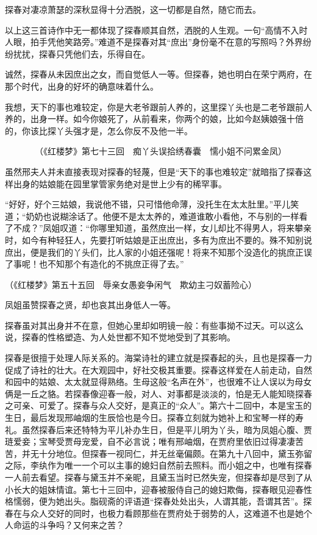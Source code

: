 \documentclass[openany,scheme = chinese, linespread = 1.5]{ctexbook}
\begin{document}
探春对凄凉萧瑟的深秋显得十分洒脱，这一切都是自然，随它而去。

以上这三首诗作中无一都体现了探春顺其自然，洒脱的人生观。一句“高情不入时人眼，拍手凭他笑路旁。”难道不是探春对其“庶出”身份毫不在意的写照吗？外界纷纷扰扰，探春只凭他们去，乐得自在。

诚然，探春从未因庶出之女，而自觉低人一等。但探春，她也明白在荣宁两府，在那个时代，出身的好坏的确意味着什么。

我想，天下的事也难较定，你是大老爷跟前人养的，这里探丫头也是二老爷跟前人养的，出身一样。如今你娘死了，从前看来，你两个的娘，比如今赵姨娘强十倍的，你该比探丫头强才是，怎么你反不及他一半。

\begin{center}
　　　　（《红楼梦》第七十三回　痴丫头误拾绣春囊　懦小姐不问累金凤）
\end{center}

虽然邢夫人并未直接表现对探春的轻蔑，但是“天下的事也难较定”就暗指了探春这样出身的姑娘能在园里掌管家务绝对是世上少有的稀罕事。

“好好，好个三姑娘，我说他不错，只可惜他命薄，没托生在太太肚里。”平儿笑道；“奶奶也说糊涂话了。他便不是太太养的，难道谁敢小看他，不与别的一样看了不成？”凤姐叹道：“你哪里知道，虽然庶出一样，女儿却比不得男人，将来攀亲时，如今有种轻狂人，先要打听姑娘是正出庶出，多有为庶出不要的。殊不知别说庶出，便是我们的丫头们，比人家的小姐还强呢！将来不知那个没造化的挑庶正误了事呢！也不知那个有造化的不挑庶正得了去。”

\begin{center}
（《红楼梦》第五十五回　辱亲女愚妾争闲气　欺幼主刁奴蓄险心）
\end{center}

凤姐虽赞探春之贤，却也哀其出身低人一等。

探春虽对其出身并不在意，但她心里却如明镜一般：有些事拗不过天。可以这么说，探春的性格塑造、为人处世都不知不觉地受到了其影响。

探春是很擅于处理人际关系的。海棠诗社的建立就是探春起的头，且也是探春一力促成了诗社的壮大。在大观园中，好社交极其重要。探春这样爱在人前走动，自然和园中的姑娘、太太就显得熟络。生母这般“名声在外”，也很难不让人误以为母女俩是一丘之貉。若探春像迎春一般，对人、对事都是淡淡的，怕是无人能知晓探春之可亲、可爱了。探春与众人交好，是真正的“众人”。第六十二回中，本是宝玉的生日，最后发现邢岫烟的生辰恰也是今日。探春立刻就为她补上和宝琴一样的寿礼。虽然探春后来还特特为平儿补办生日，但是平儿明为丫头，暗为凤姐心腹、贾琏爱妾；宝琴受贾母宠爱，自不必言说；唯有邢岫烟，在贾府里依旧过得凄凄苦苦，并无十分地位。但探春一视同仁，并无丝毫偏颇。在第九十八回中，黛玉弥留之际，李纨作为唯一一个可以主事的媳妇自然前去照料。而小姐之中，也唯有探春一人前去看望。探春与黛玉并不亲昵，且黛玉当时已然失宠，但探春却是尽到了从小长大的姐妹情谊。第七十三回中，迎春被服侍自己的媳妇欺侮，探春眼见迎春性格懦弱，便为她出头。脂砚斋的评语道“探春处处出头，人谓其能，吾谓其苦”。探春在与众人交好的同时，也极力看顾那些在贾府处于弱势的人，这难道不也是她个人命运的斗争吗？又何来之苦？
\end{document}
